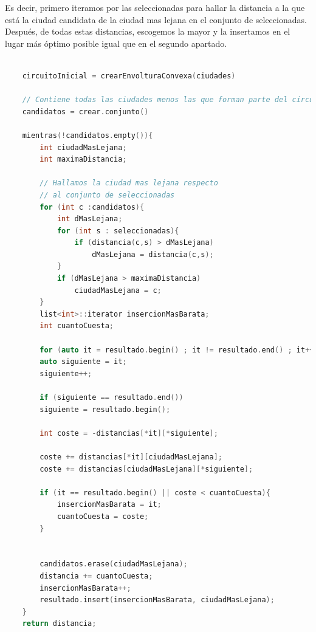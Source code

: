\documentclass{article}
\begin{document}
	Es decir, primero iteramos por las seleccionadas para hallar la distancia a la que está la ciudad candidata de la ciudad mas lejana en el conjunto de seleccionadas.
	Después, de todas estas distancias, escogemos la mayor y la insertamos en el lugar más óptimo posible igual que en el segundo apartado.
	\begin{lstlisting}[language=c, caption =Pseudocódigo de inserción con envoltura convexa y ciudad más lejana]
	
	circuitoInicial = crearEnvolturaConvexa(ciudades)
	
	// Contiene todas las ciudades menos las que forman parte del circuito inicial
	candidatos = crear.conjunto()
	
	mientras(!candidatos.empty()){
		int ciudadMasLejana;
		int maximaDistancia;
		
		// Hallamos la ciudad mas lejana respecto
		// al conjunto de seleccionadas
		for (int c :candidatos){
			int dMasLejana;
			for (int s : seleccionadas){
				if (distancia(c,s) > dMasLejana)
					dMasLejana = distancia(c,s);
			}
			if (dMasLejana > maximaDistancia)
				ciudadMasLejana = c;
		}
		list<int>::iterator insercionMasBarata;
		int cuantoCuesta;
		
		for (auto it = resultado.begin() ; it != resultado.end() ; it++){
		auto siguiente = it;
		siguiente++;
		
		if (siguiente == resultado.end())
		siguiente = resultado.begin();
		
		int coste = -distancias[*it][*siguiente];
		
		coste += distancias[*it][ciudadMasLejana];
		coste += distancias[ciudadMasLejana][*siguiente];
		
		if (it == resultado.begin() || coste < cuantoCuesta){
			insercionMasBarata = it;
			cuantoCuesta = coste;
		}
		
		
		candidatos.erase(ciudadMasLejana);
		distancia += cuantoCuesta;
		insercionMasBarata++;
		resultado.insert(insercionMasBarata, ciudadMasLejana);	
	}
	return distancia;

	\end{lstlisting}
	
\end{document}
